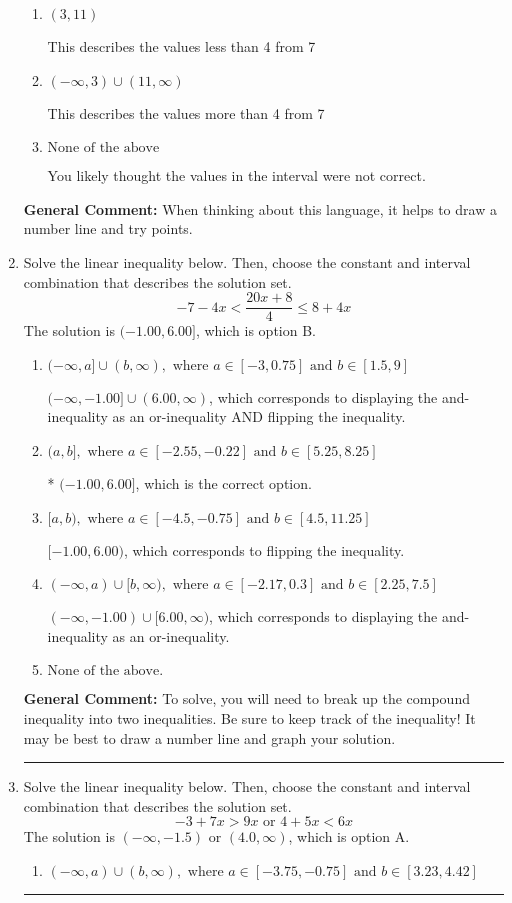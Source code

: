 \documentclass{extbook}[14pt]
\newcommand{\litem}[1]{\item #1

\rule{\textwidth}{0.4pt}}
\begin{document}
\begin{enumerate}
{\begin{enumerate}[label=\Alph*.]
This describes the values no more than 4 from 7
\item \( (3, 11) \)

This describes the values less than 4 from 7
\item \( (-\infty, 3) \cup (11, \infty) \)

This describes the values more than 4 from 7
\item \( \text{None of the above} \)

You likely thought the values in the interval were not correct.
\end{enumerate}

\textbf{General Comment:} When thinking about this language, it helps to draw a number line and try points.
}
\litem{
Solve the linear inequality below. Then, choose the constant and interval combination that describes the solution set.
\[ -7 - 4 x < \frac{20 x + 8}{4} \leq 8 + 4 x \]The solution is \( (-1.00, 6.00] \), which is option B.\begin{enumerate}[label=\Alph*.]
\item \( (-\infty, a] \cup (b, \infty), \text{ where } a \in [-3, 0.75] \text{ and } b \in [1.5, 9] \)

$(-\infty, -1.00] \cup (6.00, \infty)$, which corresponds to displaying the and-inequality as an or-inequality AND flipping the inequality.
\item \( (a, b], \text{ where } a \in [-2.55, -0.22] \text{ and } b \in [5.25, 8.25] \)

* $(-1.00, 6.00]$, which is the correct option.
\item \( [a, b), \text{ where } a \in [-4.5, -0.75] \text{ and } b \in [4.5, 11.25] \)

$[-1.00, 6.00)$, which corresponds to flipping the inequality.
\item \( (-\infty, a) \cup [b, \infty), \text{ where } a \in [-2.17, 0.3] \text{ and } b \in [2.25, 7.5] \)

$(-\infty, -1.00) \cup [6.00, \infty)$, which corresponds to displaying the and-inequality as an or-inequality.
\item \( \text{None of the above.} \)


\end{enumerate}

\textbf{General Comment:} To solve, you will need to break up the compound inequality into two inequalities. Be sure to keep track of the inequality! It may be best to draw a number line and graph your solution.
}
\litem{
Solve the linear inequality below. Then, choose the constant and interval combination that describes the solution set.
\[ -3 + 7 x > 9 x \text{ or } 4 + 5 x < 6 x \]The solution is \( (-\infty, -1.5) \text{ or } (4.0, \infty) \), which is option A.\begin{enumerate}[label=\Alph*.]
\item \( (-\infty, a) \cup (b, \infty), \text{ where } a \in [-3.75, -0.75] \text{ and } b \in [3.23, 4.42] \)


\end{enumerate}}
\end{enumerate}
\end{document}
